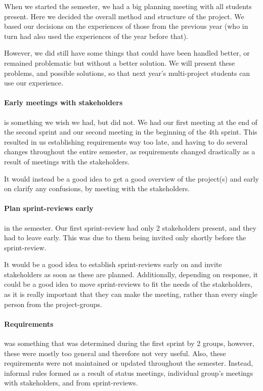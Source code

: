 When we started the semester, we had a big planning meeting with all students present.
Here we decided the overall method and structure of the project.
We based our decisions on the experiences of those from the previous year (who in turn had also used the experiences of the year before that).

However, we did still have some things that could have been handled better, or remained problematic but without a better solution.
We will present these problems, and possible solutions, so that next year's multi-project students can use our experience.

\paragraph{Early meetings with stakeholders} is something we wish we had, but did not.
We had our first meeting at the end of the second sprint and our second meeting in the beginning of the 4th sprint.
This resulted in us establishing requirements way too late, and having to do several changes throughout the entire semester, as requirements changed drastically as a result of meetings with the stakeholders.

It would instead be a good idea to get a good overview of the project(s) and early on clarify any confusions, by meeting with the stakeholders.

\paragraph{Plan sprint-reviews early} in the semester.
Our first sprint-review had only 2 stakeholders present, and they had to leave early.
This was due to them being invited only shortly before the sprint-review.

It would be a good idea to establish sprint-reviews early on and invite stakeholders as soon as these are planned.
Additionally, depending on response, it could be a good idea to move sprint-reviews to fit the needs of the stakeholders, as it is really important that they can make the meeting, rather than every single person from the project-groups.

\paragraph{Requirements} was something that was determined during the first sprint by 2 groups, however, these were mostly too general and therefore not very useful.
Also, these requirements were not maintained or updated throughout the semester.
Instead, informal rules formed as a result of status meetings, individual group's meetings with stakeholders, and from sprint-reviews.

